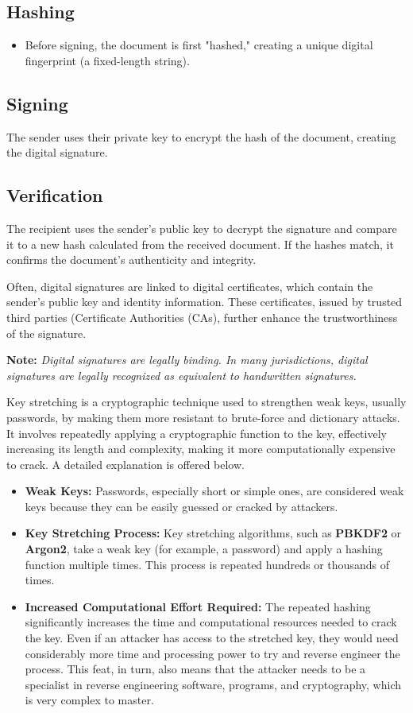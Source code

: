 \subsection{Hashing}
\begin{itemize}
    \item Before signing, the document is first "hashed," creating a unique digital fingerprint (a fixed-length string).
\end{itemize}

\subsection{Signing} 
The sender uses their private key to encrypt the hash of the document, creating the digital signature.

\subsection{Verification}
The recipient uses the sender's public key to decrypt the signature and compare it to a new hash calculated from the received document. If the hashes match, it confirms the document's authenticity and integrity.

Often, digital signatures are linked to digital certificates, which contain the sender's public key and identity information. These certificates, issued by trusted third parties (Certificate Authorities (CAs), further enhance the trustworthiness of the signature.

\textbf{Note:} \textit{Digital signatures are legally binding. In many jurisdictions, digital signatures are legally recognized as equivalent to handwritten signatures.}

 Key stretching is a cryptographic technique used to strengthen weak keys, usually passwords, by making them more resistant to brute-force and dictionary attacks. It involves repeatedly applying a cryptographic function to the key, effectively increasing its length and complexity, making it more computationally expensive to crack. A detailed explanation is offered below.
\begin{itemize}
    \item \textbf{Weak Keys:} Passwords, especially short or simple ones, are considered weak keys because they can be easily guessed or cracked by attackers.
    \item \textbf{Key Stretching Process:} Key stretching algorithms, such as \textbf{PBKDF2} or \textbf{Argon2}, take a weak key (for example, a password) and apply a hashing function multiple times. This process is repeated hundreds or thousands of times.
    \item \textbf{Increased Computational Effort Required:} The repeated hashing significantly increases the time and computational resources needed to crack the key. Even if an attacker has access to the stretched key, they would need considerably more time and processing power to try and reverse engineer the process. This feat, in turn, also means that the attacker needs to be a specialist in reverse engineering software, programs, and cryptography, which is very complex to master.
\end{itemize}

